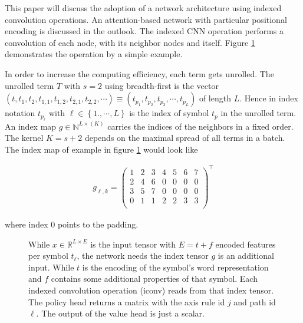 \documentclass{scrartcl}
\theoremstyle{definition}
\begin{document}
This paper will discuss the adoption of a network architecture using indexed convolution operations.
An attention-based network with particular positional encoding is discussed in the outlook. 
The indexed CNN operation performs a convolution of each node, with its neighbor nodes and itself.
Figure \ref{fig:index_tensor} demonstrates the operation by a simple example.

\begin{figure}[!htbp]
	\centering
	
	\label{fig:index_tensor}
\end{figure}

In order to increase the computing efficiency, each term gets unrolled.
The unrolled term $T$ with $s=2$ using breadth-first is the vector $\left( t, t_1, t_2, t_{1,1},t_{1,2}, t_{2,1}, t_{2,2}, \cdots \right) \equiv  \left( t_{p_1}, t_{p_2}, t_{p_3},\cdots, t_{p_L} \right)$ of length $L$.
Hence in index notation $t_{p_\ell}$ with $\ell \in \left\{1., \cdots,L\right\}$ is the index of symbol $t_p$ in the unrolled term.
An index map $g \in \mathbb{N}^{L\times \left(K\right)}$ carries the indices of the neighbors in a fixed order.
The kernel $K= s+2$ depends on the maximal spread of all terms in a batch.
The index map of example in figure \ref{fig:index_tensor} would look like

\begin{align}
	g_{\ell,k} = 
	\begin{pmatrix}
		1 & 2 & 3 & 4 & 5 & 6 & 7 \\
		2 & 4 & 6 & 0 & 0 & 0 & 0 \\
		3 & 5 & 7 & 0 & 0 & 0 & 0 \\
		0 & 1 & 1 & 2 & 2 & 3 & 3 \\
	\end{pmatrix}^\top
\end{align}

where index $0$ points to the padding.


\begin{figure}[!htbp]
	\centering
	
	\caption{While $x\in \mathbb{R}^{L\times E}$ is the input tensor with $E=t+f$ encoded features per symbol $t_\ell$, the network needs the index tensor $g$ is an additional input.
		While $t$ is the encoding of the symbol's word representation and $f$ contains some additional properties of that symbol.
		Each indexed convolution operation (iconv) reads from that index tensor.
		The policy head returns a matrix with the axis rule id $j$ and path id $\ell$. 
		The output of the value head is just a scalar. 
	}
	\label{fig:iconv_network}
\end{figure}
\end{document}
